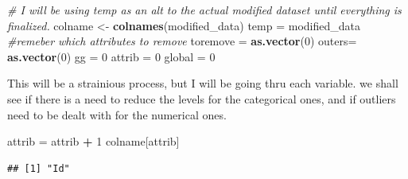 \documentclass[]{article}
\newenvironment{Shaded}{\begin{snugshade}}{\end{snugshade}}
\newcommand{\KeywordTok}[1]{\textcolor[rgb]{0.13,0.29,0.53}{\textbf{#1}}}
\newcommand{\DecValTok}[1]{\textcolor[rgb]{0.00,0.00,0.81}{#1}}
\newcommand{\StringTok}[1]{\textcolor[rgb]{0.31,0.60,0.02}{#1}}
\newcommand{\CommentTok}[1]{\textcolor[rgb]{0.56,0.35,0.01}{\textit{#1}}}
\newcommand{\ControlFlowTok}[1]{\textcolor[rgb]{0.13,0.29,0.53}{\textbf{#1}}}
\newcommand{\OperatorTok}[1]{\textcolor[rgb]{0.81,0.36,0.00}{\textbf{#1}}}
\newcommand{\NormalTok}[1]{#1}
\begin{document}
\begin{Shaded}
\begin{Highlighting}[]
\CommentTok{# I will be using temp as an alt to the actual modified dataset until everything is finalized. }
\NormalTok{colname <-}\StringTok{ }\KeywordTok{colnames}\NormalTok{(modified_data)}
\NormalTok{temp =}\StringTok{ }\NormalTok{modified_data}
\CommentTok{#remeber which attributes to remove}
\NormalTok{toremove =}\StringTok{ }\KeywordTok{as.vector}\NormalTok{(}\DecValTok{0}\NormalTok{)}
\NormalTok{outers=}\StringTok{ }\KeywordTok{as.vector}\NormalTok{(}\DecValTok{0}\NormalTok{)}
\NormalTok{gg =}\StringTok{ }\DecValTok{0}
\NormalTok{attrib =}\StringTok{ }\DecValTok{0}
\NormalTok{global =}\StringTok{ }\DecValTok{0}
\end{Highlighting}
\end{Shaded}

This will be a strainious process, but I will be going thru each
variable. we shall see if there is a need to reduce the levels for the
categorical ones, and if outliers need to be dealt with for the
numerical ones.

\begin{Shaded}
\begin{Highlighting}[]
\NormalTok{attrib =}\StringTok{ }\NormalTok{attrib }\OperatorTok{+}\StringTok{ }\DecValTok{1}
\NormalTok{colname[attrib]}
\end{Highlighting}
\end{Shaded}

\begin{verbatim}
## [1] "Id"
\end{verbatim}

\begin{Shaded}
\end{Shaded}
\end{document}
